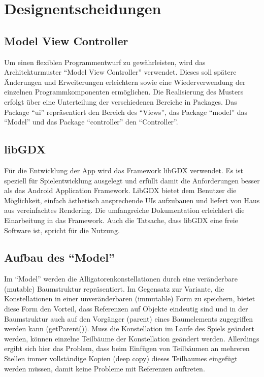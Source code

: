 \chapter{Designentscheidungen}

\section{Model View Controller}
Um einen flexiblen Programmentwurf zu gewährleisten, wird das Architekturmuster "`Model View Controller"' verwendet.
Dieses soll spätere Änderungen und Erweiterungen erleichtern sowie eine Wiederverwendung der einzelnen Programmkomponenten ermöglichen.
Die Realisierung des Musters erfolgt über eine Unterteilung der verschiedenen Bereiche in Packages.
 Das Package "`ui"' repräsentiert den Bereich des "`Views"', das Package "`model"' das "`Model"' und das Package "`controller"' den "`Controller"'.


\section{libGDX}
Für die Entwicklung der App wird das Framework libGDX verwendet.
Es ist speziell für Spielentwicklung ausgelegt und erfüllt damit die Anforderungen besser als das Android Application Framework.
 LibGDX bietet dem Benutzer die Möglichkeit, einfach ästhetisch ansprechende UIs aufzubauen und liefert von Haus aus vereinfachtes Rendering.
Die umfangreiche Dokumentation erleichtert die Einarbeitung in das Framework.
Auch die Tatsache, dass libGDX eine freie Software ist, spricht für die Nutzung.

\section{Aufbau des "`Model"'}
Im "`Model"' werden die Alligatorenkonstellationen durch eine veränderbare (mutable) Baumstruktur repräsentiert.
 Im Gegensatz zur Variante, die Konstellationen in einer unveränderbaren (immutable) Form zu speichern, bietet diese Form den Vorteil, dass Referenzen auf Objekte eindeutig sind und in der Baumstruktur auch auf den Vorgänger (parent) eines Baumelements zugegriffen werden kann (getParent()).
Muss die Konstellation im Laufe des Spiels geändert werden, können einzelne Teilbäume der Konstellation geändert werden.
Allerdings ergibt sich hier das Problem, dass beim Einfügen von Teilbäumen an mehreren Stellen immer vollständige Kopien (deep copy) dieses Teilbaumes eingefügt werden müssen, damit keine Probleme mit Referenzen auftreten.

